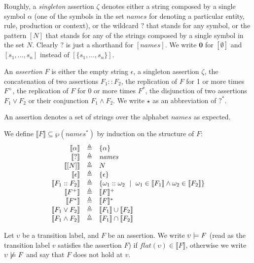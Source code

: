 Roughly, a \emph{singleton} assertion $\zeta$ denotes either a string composed by a single symbol $\alpha$ (one of the symbols in the set $\mathit{names}$ for denoting a particular entity, rule, production or context), or
the wildcard $?$ that stands for any symbol, or the pattern $[N]$ that stands for any of the strings composed by a single symbol in the set $N$. Clearly $?$  is just a shorthand for $[\mathit{names}]$.
We write $\mathbf{0}$ for $[\emptyset]$ and $[s_1,...,s_n]$ instead of $[\{s_1,...,s_n\}]$. 

An \emph{assertion} $F$ is either the empty string $\epsilon$, a singleton assertion $\zeta$, the concatenation of two assertions $F_1::F_2$, the replication of $F$ for 1 or more times $F^+$, the replication of $F$ for 0 or more times $F^*$, the disjunction of two assertions $F_1 \vee F_2$ or their conjunction $F_1 \wedge F_2$. We write $\star$ as an abbreviation of $?^*$.

An assertion denotes a set of strings over the alphabet $\mathit{names}$ as expected.

\begin{definition}
 We define $\llbracket F\rrbracket \subseteq\wp(\mathit{names}^*)$ by induction on the structure of $F$: 
\[
\begin{array}{rcl}
 \llbracket \alpha \rrbracket &\triangleq&  \{\alpha\} \\
 \llbracket ? \rrbracket &\triangleq&   \mathit{names}\\
 \llbracket [N]\rrbracket &\triangleq&   N\\
 \llbracket \epsilon \rrbracket &\triangleq&  \{\epsilon\} \\
 \llbracket F_1::F_2 \rrbracket &\triangleq& \{\omega_1 :: \omega_2~\mid~ \omega_1 \in \llbracket F_1 \rrbracket \wedge \omega_2 \in \llbracket F_2 \rrbracket\}  \\
 \llbracket F^+ \rrbracket &\triangleq& \llbracket F \rrbracket^+  \\
 \llbracket F^* \rrbracket &\triangleq& \llbracket F \rrbracket^*  \\
 \llbracket  F_1 \vee F_2 \rrbracket &\triangleq& \llbracket  F_1\rrbracket \cup \llbracket  F_2\rrbracket  \\
 \llbracket  F_1 \wedge F_2 \rrbracket &\triangleq& \llbracket F_1 \rrbracket \cap \llbracket F_2\rrbracket 
\end{array}
\]
\end{definition}




\begin{definition}\label{sec:semantics}
Let  $\upsilon$ be  a transition label, and $F$ be an assertion.
We write $\upsilon \models F$ (read as the transition label $v$ satisfies the assertion $F$) 
if $\mathit{flat}(\upsilon)\in \llbracket F\rrbracket$, otherwise we write $\upsilon \not\models F$ and say that $F$ does not hold at $v$. 
\end{definition}

